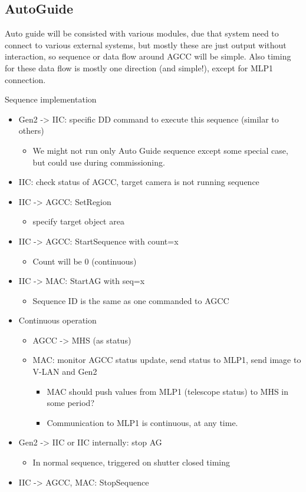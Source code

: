 \documentclass[a4paper,notitlepage]{article}
\begin{document}
\subsection{AutoGuide}

Auto guide will be consisted with various modules, due that system need to connect to various external systems, but mostly these are just output without interaction, so sequence or data flow around AGCC will be simple. Also timing for these data flow is mostly one direction (and simple!), except for MLP1 connection. 

Sequence implementation
\begin{itemize}
  \item Gen2 -> IIC: specific DD command to execute this sequence (similar to others)
  \begin{itemize}
    \item We might not run only Auto Guide sequence except some special case, but could use during commissioning. 
  \end{itemize}
  \item IIC: check status of AGCC, target camera is not running sequence
  \item IIC -> AGCC: SetRegion 
  \begin{itemize}
    \item specify target object area
  \end{itemize}
  \item IIC -> AGCC: StartSequence with count=x
  \begin{itemize}
    \item Count will be 0 (continuous)
  \end{itemize}
  \item IIC -> MAC: StartAG with seq=x
  \begin{itemize}
    \item Sequence ID is the same as one commanded to AGCC
  \end{itemize}
  \item Continuous operation
  \begin{itemize}
    \item AGCC -> MHS (as status)
    \item MAC: monitor AGCC status update, send status to MLP1, send image to V-LAN and Gen2
    \begin{itemize}
      \item MAC should push values from MLP1 (telescope status) to MHS in some period?
      \item Communication to MLP1 is continuous, at any time.
    \end{itemize}
  \end{itemize}
  \item Gen2 -> IIC or IIC internally: stop AG
  \begin{itemize}
    \item In normal sequence, triggered on shutter closed timing
  \end{itemize}
  \item IIC -> AGCC, MAC: StopSequence
\end{itemize}
\end{document}
